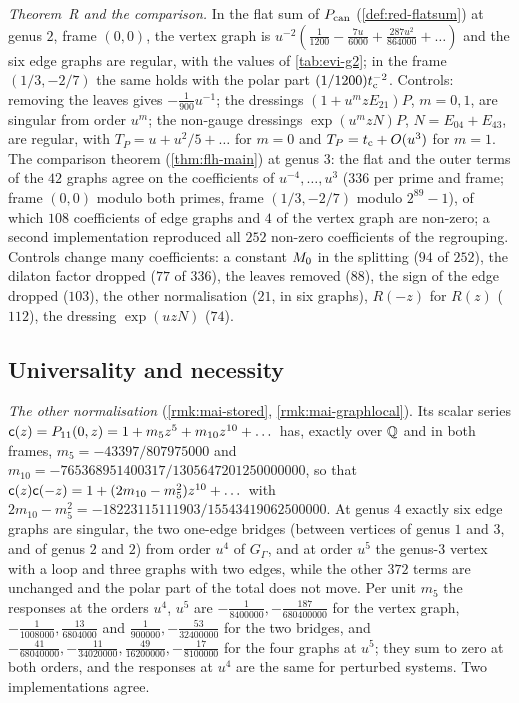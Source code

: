 \emph{Theorem~R and the comparison.} In the flat sum of $P_{\mathrm{can}}$ (\cref{def:red-flatsum}) at genus $2$, frame $(0,0)$, the vertex graph is $u^{-2}(\tfrac1{1200}-\tfrac{7u}{6000}+\tfrac{287u^2}{864000}+\dots)$ and the six edge graphs are regular, with the values of \cref{tab:evi-g2}; in the frame $(1/3,-2/7)$ the same holds with the polar part $(1/1200)t_{\mathrm{c}}^{-2}$. Controls: removing the leaves gives $-\tfrac1{900}u^{-1}$; the dressings $(1+u^mzE_{21})P$, $m=0,1$, are singular from order $u^m$; the non-gauge dressings $\exp(u^mzN)P$, $N=E_{04}+E_{43}$, are regular, with $T_P=u+u^2/5+\dots$ for $m=0$ and $T_P=t_{\mathrm{c}}+O(u^3)$ for $m=1$. The comparison theorem (\cref{thm:flh-main}) at genus $3$: the flat and the outer terms of the $42$ graphs agree on the coefficients of $u^{-4},\dots,u^3$ ($336$ per prime and frame; frame $(0,0)$ modulo both primes, frame $(1/3,-2/7)$ modulo $2^{89}-1$), of which $108$ coefficients of edge graphs and $4$ of the vertex graph are non-zero; a second implementation reproduced all $252$ non-zero coefficients of the regrouping. Controls change many coefficients: a constant $M_{0}$ in the splitting ($94$ of $252$), the dilaton factor dropped ($77$ of $336$), the leaves removed ($88$), the sign of the edge dropped ($103$), the other normalisation ($21$, in six graphs), $R(-z)$ for $R(z)$ ($112$), the dressing $\exp(uzN)$ ($74$).

\subsection{Universality and necessity}
\label{sec:evi-univ}

\emph{The other normalisation} (\cref{rmk:mai-stored}, \cref{rmk:mai-graphlocal}). Its scalar series $\mathsf{c}(z)=P_{11}(0,z)=1+m_5z^5+m_{10}z^{10}+\dots$ has, exactly over $\mathbb{Q}$ and in both frames, $m_5=-43397/807975000$ and $m_{10}=-765368951400317/1305647201250000000$, so that $\mathsf{c}(z)\mathsf{c}(-z)=1+(2m_{10}-m_5^2)z^{10}+\dots$ with $2m_{10}-m_5^2=-18223115111903/15543419062500000$. At genus $4$ exactly six edge graphs are singular, the two one-edge bridges (between vertices of genus $1$ and $3$, and of genus $2$ and $2$) from order $u^4$ of $G_\Gamma$, and at order $u^5$ the genus-$3$ vertex with a loop and three graphs with two edges, while the other $372$ terms are unchanged and the polar part of the total does not move. Per unit $m_5$ the responses at the orders $u^4$, $u^5$ are $-\tfrac{1}{8400000},-\tfrac{187}{680400000}$ for the vertex graph, $-\tfrac{1}{1008000},\tfrac{13}{6804000}$ and $\tfrac{1}{900000},-\tfrac{53}{32400000}$ for the two bridges, and $-\tfrac{41}{68040000},-\tfrac{11}{34020000},\tfrac{49}{16200000},-\tfrac{17}{8100000}$ for the four graphs at $u^5$; they sum to zero at both orders, and the responses at $u^4$ are the same for perturbed systems. Two implementations agree.

